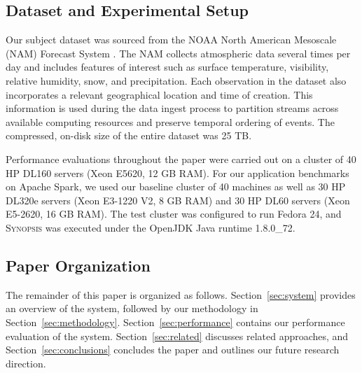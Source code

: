 \subsection{Dataset and Experimental Setup}
Our subject dataset was sourced from the NOAA North American Mesoscale (NAM) Forecast System \cite{noaa_nam}.  The NAM collects atmospheric data several times per day and includes features of interest such as surface temperature, visibility, relative humidity, snow, and precipitation. Each observation in the dataset also incorporates a relevant geographical location and time of creation. This information is used during the data ingest process to partition streams across available computing resources and preserve temporal ordering of events. The compressed, on-disk size of the entire dataset was 25 TB.

Performance evaluations throughout the paper were carried out on a cluster of 40 HP DL160 servers (Xeon E5620, 12 GB RAM). For our application benchmarks on Apache Spark, we used our baseline cluster of 40 machines as well as 30 HP DL320e servers (Xeon E3-1220 V2, 8 GB RAM) and 30 HP DL60 servers (Xeon E5-2620, 16 GB RAM). The test cluster was configured to run Fedora 24, and \textsc{Synopsis} was executed under the OpenJDK Java runtime 1.8.0\_72.

\subsection{Paper Organization}
The remainder of this paper is organized as follows. Section~\ref{sec:system} provides an overview of the system, followed by our methodology in Section~\ref{sec:methodology}. Section~\ref{sec:performance} contains our performance evaluation of the system. Section~\ref{sec:related} discusses related approaches, and Section~\ref{sec:conclusions} concludes the paper and outlines our future research direction.

